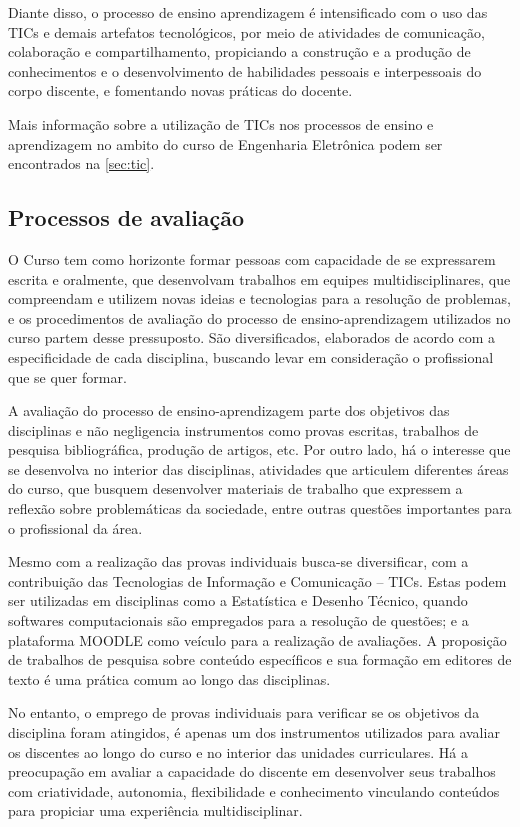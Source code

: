 Diante disso, o processo de ensino aprendizagem é intensificado com o uso das TICs e demais artefatos tecnológicos, por meio de atividades de comunicação, colaboração e compartilhamento, propiciando a construção e a produção de conhecimentos e o desenvolvimento de habilidades pessoais e interpessoais do corpo discente, e fomentando novas práticas do docente.

Mais informação sobre a utilização de TICs nos processos de ensino e aprendizagem no ambito do curso de Engenharia Eletrônica podem ser encontrados na \autoref{sec:tic}.

\subsection{Processos de avaliação}

O Curso tem como horizonte formar pessoas com capacidade de se expressarem escrita e oralmente, que desenvolvam trabalhos em equipes multidisciplinares, que compreendam e utilizem novas ideias e tecnologias para a resolução de problemas, e os procedimentos de avaliação do processo de ensino-aprendizagem utilizados no curso partem desse pressuposto. São diversificados, elaborados de acordo com a especificidade de cada disciplina, buscando levar em consideração o profissional que se quer formar.

A avaliação do processo de ensino-aprendizagem parte dos objetivos das disciplinas e não negligencia instrumentos como provas escritas, trabalhos de pesquisa bibliográfica, produção de artigos, etc. Por outro lado, há o interesse que se desenvolva no interior das disciplinas, atividades que articulem diferentes áreas do curso, que busquem desenvolver materiais de trabalho que expressem a reflexão sobre problemáticas da sociedade, entre outras questões importantes para o profissional da área.

Mesmo com a realização das provas individuais busca-se diversificar, com a contribuição das Tecnologias de Informação e Comunicação – TICs. Estas podem ser utilizadas em disciplinas como a Estatística e Desenho Técnico, quando softwares computacionais são empregados para a resolução de questões; e a plataforma MOODLE como veículo para a realização de avaliações. A proposição de trabalhos de pesquisa sobre conteúdo específicos e sua formação em editores de texto é uma prática comum ao longo das disciplinas.

No entanto, o emprego de provas individuais para verificar se os objetivos da disciplina foram atingidos, é apenas um dos instrumentos utilizados para avaliar os discentes ao longo do curso e no interior das unidades curriculares. Há a preocupação em avaliar a capacidade do discente em desenvolver seus trabalhos com criatividade, autonomia, flexibilidade e conhecimento vinculando conteúdos para propiciar uma experiência multidisciplinar. 

